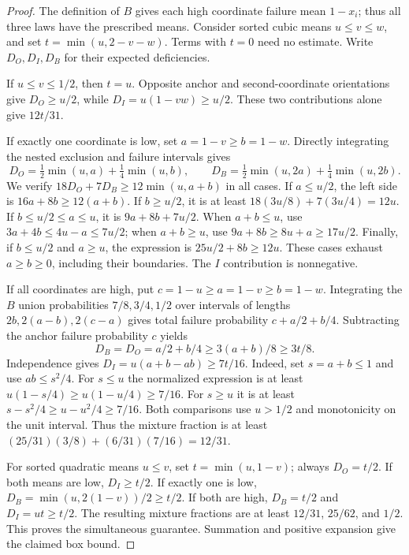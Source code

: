 \begin{proof}
The definition of $B$ gives each high coordinate failure mean $1-x_i$;
thus all three laws have the prescribed means. Consider sorted cubic
means $u\le v\le w$, and set $t=\min(u,2-v-w)$. Terms with $t=0$
need no estimate. Write $D_O,D_I,D_B$ for their expected deficiencies.

If $u\le v\le1/2$, then $t=u$. Opposite anchor and second-coordinate
orientations give $D_O\ge u/2$, while $D_I=u(1-vw)\ge u/2$.
These two contributions alone give $12t/31$.

If exactly one coordinate is low, set $a=1-v\ge b=1-w$. Directly
integrating the nested exclusion and failure intervals gives
\[
 D_O=\tfrac12\min(u,a)+\tfrac14\min(u,b),\qquad
 D_B=\tfrac12\min(u,2a)+\tfrac14\min(u,2b).
\]
We verify $18D_O+7D_B\ge12\min(u,a+b)$ in all cases. If $a\le u/2$,
the left side is $16a+8b\ge12(a+b)$. If $b\ge u/2$, it is at least
$18(3u/8)+7(3u/4)=12u$. If $b\le u/2\le a\le u$, it is
$9a+8b+7u/2$. When $a+b\le u$, use
$3a+4b\le4u-a\le7u/2$; when $a+b\ge u$, use
$9a+8b\ge8u+a\ge17u/2$. Finally, if $b\le u/2$ and $a\ge u$,
the expression is $25u/2+8b\ge12u$. These cases exhaust $a\ge b\ge0$,
including their boundaries. The $I$ contribution is nonnegative.

If all coordinates are high, put $c=1-u\ge a=1-v\ge b=1-w$.
Integrating the $B$ union probabilities $7/8,3/4,1/2$ over intervals of
lengths $2b,2(a-b),2(c-a)$ gives total failure probability
$c+a/2+b/4$. Subtracting the anchor failure probability $c$ yields
\[
 D_B=D_O=a/2+b/4\ge3(a+b)/8\ge3t/8.
\]
Independence gives $D_I=u(a+b-ab)\ge7t/16$. Indeed, set $s=a+b\le1$
and use $ab\le s^2/4$. For $s\le u$ the normalized expression is at
least $u(1-s/4)\ge u(1-u/4)\ge7/16$. For $s\ge u$ it is at least
$s-s^2/4\ge u-u^2/4\ge7/16$. Both comparisons use $u>1/2$ and
monotonicity on the unit interval. Thus the mixture fraction is at least
$(25/31)(3/8)+(6/31)(7/16)=12/31$.

For sorted quadratic means $u\le v$, set $t=\min(u,1-v)$; always
$D_O=t/2$. If both means are low, $D_I\ge t/2$. If exactly one is low,
$D_B=\min(u,2(1-v))/2\ge t/2$. If both are high, $D_B=t/2$ and
$D_I=ut\ge t/2$. The resulting mixture fractions are at least
$12/31$, $25/62$, and $1/2$. This proves the simultaneous guarantee.
Summation and positive expansion give the claimed box bound.


\end{proof}
